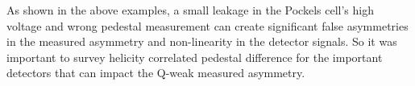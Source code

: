 As shown in the above examples, a small leakage in the Pockels cell's high voltage and wrong pedestal measurement can create significant false asymmetries in the measured asymmetry and non-linearity in the detector signals. So it was important to survey helicity correlated pedestal difference for the important detectors that can impact the Q-weak measured asymmetry. 


%
%

